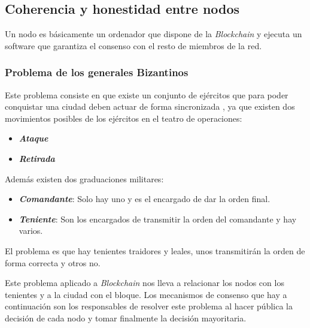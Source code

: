 \subsection{Coherencia y honestidad entre nodos}


Un nodo es básicamente un ordenador que dispone de la \textit{Blockchain} y ejecuta un software que garantiza el consenso con el resto de miembros de la red.

\subsubsection{Problema de los generales Bizantinos}
Este problema\cite{eswiki:142632281} consiste en que existe un conjunto de ejércitos que para poder conquistar una ciudad deben actuar de forma sincronizada , ya que existen dos movimientos posibles de los ejércitos en el teatro de operaciones:
\begin{itemize}
    \item \textbf{\textit{Ataque}}
    \item \textbf{\textit{Retirada}}
\end{itemize}

Además existen dos graduaciones militares:
\begin{itemize}
    \item \textbf{\textit{Comandante}}: Solo hay uno y es el encargado de dar la orden final.
    \item \textbf{\textit{Teniente}}: Son los encargados de transmitir la orden del comandante y hay varios.
\end{itemize}

El problema es que hay tenientes traidores y leales, unos transmitirán la orden de forma correcta y otros no.

Este problema aplicado a \textit{Blockchain} nos lleva a relacionar los nodos con los tenientes y a la ciudad con el bloque. Los mecanismos de consenso que hay a continuación son los responsables de resolver este problema al hacer pública la decisión de cada nodo y tomar finalmente la decisión mayoritaria.

